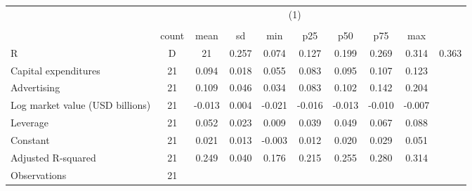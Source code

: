 {
\def\sym#1{\ifmmode^{#1}\else\(^{#1}\)\fi}
\begin{tabular}{l*{1}{cccccccc}}
\hline\hline
                    &                                                                                \\
                    &                                                                                   \\
                    &       count&        mean&          sd&         min&         p25&         p50&         p75&         max\\
\hline
R&D                 &          21&       0.257&       0.074&       0.127&       0.199&       0.269&       0.314&       0.363\\
Capital expenditures&          21&       0.094&       0.018&       0.055&       0.083&       0.095&       0.107&       0.123\\
Advertising         &          21&       0.109&       0.046&       0.034&       0.083&       0.102&       0.142&       0.204\\
Log market value (USD billions)&          21&      -0.013&       0.004&      -0.021&      -0.016&      -0.013&      -0.010&      -0.007\\
Leverage            &          21&       0.052&       0.023&       0.009&       0.039&       0.049&       0.067&       0.088\\
Constant            &          21&       0.021&       0.013&      -0.003&       0.012&       0.020&       0.029&       0.051\\
Adjusted R-squared  &          21&       0.249&       0.040&       0.176&       0.215&       0.255&       0.280&       0.314\\
\hline
Observations        &          21&            &            &            &            &            &            &            \\
\hline\hline
\end{tabular}
}
